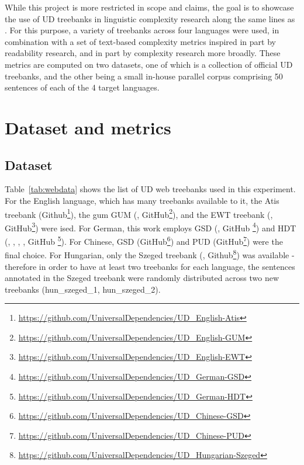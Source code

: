 \documentclass[11pt]{article}
\begin{document}
While this project is more restricted in scope and claims, the goal is to showcase the use of UD treebanks in linguistic complexity research along the same lines as \citealp{berdicevskis-etal-2018-using}. For this purpose, a variety of treebanks across four languages were used, in combination with a set of text-based complexity metrics inspired in part by readability research, and in part by complexity research more broadly. These metrics are computed on two datasets, one of which is a collection of official UD treebanks, and the other being a small in-house parallel corpus comprising 50 sentences of each of the 4 target languages.

\section{Dataset and metrics}

\subsection{Dataset}




Table~\ref{tab:webdata} shows the list of UD web treebanks used in this experiment. For the English language, which has many treebanks available to it, the Atis treebank (Github\footnote{\url{https://github.com/UniversalDependencies/UD_English-Atis}}), the gum GUM (\citealp{berzak2016tle}, GitHub\footnote{\url{https://github.com/UniversalDependencies/UD_English-GUM}}), and the EWT treebank (\citealp{silveira14gold}, GitHub\footnote{\url{https://github.com/UniversalDependencies/UD_English-EWT}}) were ised. For German, this work employs GSD (\citealp{mcdonald-etal-2013-universal}, GitHub \footnote{\url{https://github.com/UniversalDependencies/UD_German-GSD}}) and HDT (\citealp{borges-volker-etal-2019-hdt}, \citealp{hennig-kohn-2017-dependency}, \citealp{hdtextra}, \citealp{hdtguide}, GitHub \footnote{\url{https://github.com/UniversalDependencies/UD_German-HDT}}). For Chinese, 
GSD (GitHub\footnote{\url{https://github.com/UniversalDependencies/UD_Chinese-GSD}}) and PUD (GitHub\footnote{\url{https://github.com/UniversalDependencies/UD_Chinese-PUD}}) were the final choice. For Hungarian, only the Szeged treebank (\citealp{szeged}, Github\footnote{\url{https://github.com/UniversalDependencies/UD_Hungarian-Szeged}}) was available - therefore in order to have at least two treebanks for each language, the sentences annotated in the Szeged treebank were randomly distributed across two new treebanks (hun\_szeged\_1, hun\_szeged\_2).
\end{document}
